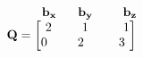 \documentclass[preview]{standalone}
\begin{document}
\begin{align*}
\begin{array}{ccc}\begin{matrix}\hspace{1cm} \mathbf{b_{x}} & \hspace{0.25cm} \mathbf{b_{y}} \hspace{0.25cm}& \hspace{0.25cm} \mathbf{b_{z}} \end{matrix} \\ \mathbf{Q} = \begin{bmatrix} 2 & \hspace{0.25cm} 1 \hspace{0.25cm}& \hspace{0.25cm} 1 \\ 0 \hspace{0.25cm} & \hspace{0.25cm} 2 \hspace{0.25cm}\hspace{0.25cm} & 3 \end{bmatrix} \end{array}
\end{align*}
\end{document}
